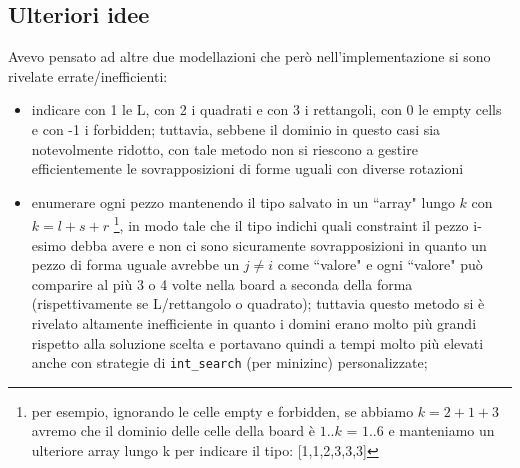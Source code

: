 \documentclass{article}
\begin{document}
\subsection{Ulteriori idee}
Avevo pensato ad altre due modellazioni che però nell'implementazione si sono rivelate errate/inefficienti:
\begin{itemize}
    \item indicare con 1 le L, con 2 i quadrati e con 3 i rettangoli, con 0 le empty cells e con -1 i forbidden; tuttavia, sebbene il dominio in questo casi sia notevolmente ridotto, con tale metodo non si riescono a gestire efficientemente le sovrapposizioni di forme uguali con diverse rotazioni
    \item enumerare ogni pezzo mantenendo il tipo salvato in un ``array" lungo $k$ con $k=l+s+r$ \footnote{per esempio, ignorando le celle empty e forbidden, se abbiamo $k=2+1+3$ avremo che il dominio delle celle della board è $1..k$ = $1..6$ e manteniamo un ulteriore array lungo k per indicare il tipo: [1,1,2,3,3,3]}, in modo tale che il tipo indichi quali constraint il pezzo i-esimo debba avere e non ci sono sicuramente sovrapposizioni in quanto un pezzo di forma uguale avrebbe un $j \neq i$ come ``valore" e ogni ``valore" può comparire al più 3 o 4 volte nella board a seconda della forma (rispettivamente se L/rettangolo o quadrato); tuttavia questo metodo si è rivelato altamente inefficiente in quanto i domini erano molto più grandi rispetto alla soluzione scelta e portavano quindi a tempi molto più elevati anche con strategie di \texttt{int\_search} (per minizinc) personalizzate;
\end{itemize}
\end{document}
